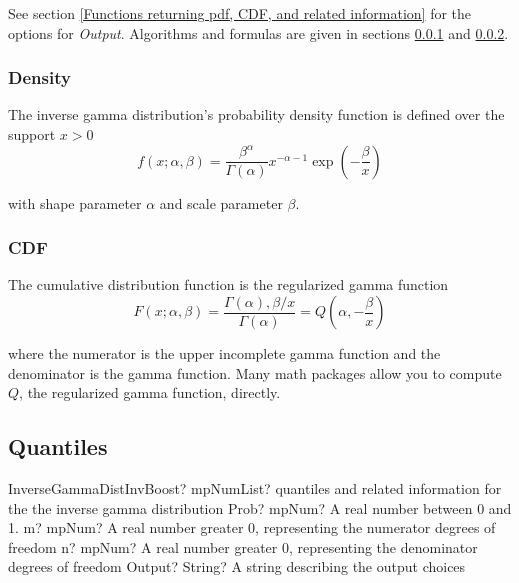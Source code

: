 \vspace{0.3cm}
See section \ref{Functions returning pdf, CDF, and related information} for the options for {\itshape\sffamily Output}. Algorithms and formulas are given in sections \ref{InverseGammaDistributionDensity} and \ref{InverseGammaDistributionCDF}.


\subsubsection{Density}
\label{InverseGammaDistributionDensity}

The inverse gamma distribution's probability density function is defined over the support $x>0$
\begin{equation} 
	f(x;\alpha,\beta)= \frac{\beta^{\alpha}}{\Gamma(\alpha)} x^{-\alpha-1} \exp \left(-\frac{\beta}{x} \right)
\end{equation}


with shape parameter $\alpha$ and scale parameter $\beta$.



\subsubsection{CDF}
\label{InverseGammaDistributionCDF}
The cumulative distribution function is the regularized gamma function
\begin{equation} 
	F(x;\alpha,\beta)= \frac{\Gamma(\alpha),\beta/x}{\Gamma(\alpha)} = Q \left(\alpha, -\frac{\beta}{x} \right)
\end{equation}


where the numerator is the upper incomplete gamma function and the denominator is the gamma function. Many math packages allow you to compute $Q$, the regularized gamma function, directly.




\subsection{Quantiles}

\begin{mpFunctionsExtract}
	\mpFunctionFourNotImplemented
	{InverseGammaDistInvBoost? mpNumList? quantiles and related information for the the inverse gamma distribution}
	{Prob? mpNum? A real number between 0 and 1.}
	{m? mpNum? A real number greater 0, representing the numerator  degrees of freedom}
	{n? mpNum? A real number greater 0, representing the denominator degrees of freedom}
	{Output? String? A string describing the output choices}
\end{mpFunctionsExtract}

